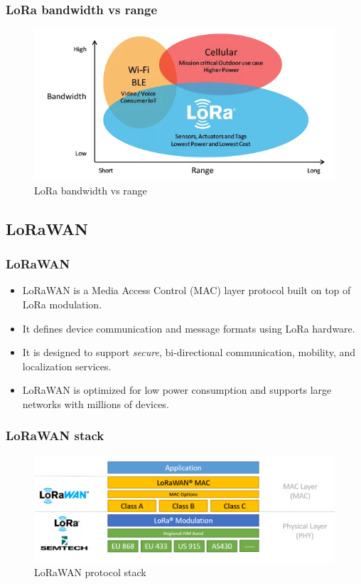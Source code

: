 \documentclass{beamer}
\begin{document}
\begin{frame}
    \frametitle{LoRa bandwidth vs range}
    \begin{figure}
        \centering
        \includegraphics[width=\textwidth]{images/bandwidth-vs-range.png}
        \caption{LoRa bandwidth vs range}
    \end{figure}
\end{frame}

\subsection{LoRaWAN}
\begin{frame}
    \frametitle{LoRaWAN}
    \begin{itemize}[<+->]
        \item LoRaWAN is a Media Access Control (MAC) layer protocol built on top of LoRa
              modulation.
        \item It defines device communication and message formats using LoRa hardware.
        \item It is designed to support \emph{secure}, bi-directional communication,
              mobility, and localization services.
        \item LoRaWAN is optimized for low power consumption and supports large networks with
              millions of devices.
    \end{itemize}
\end{frame}

\begin{frame}
    \frametitle{LoRaWAN stack}
    \begin{figure}
        \centering
        \includegraphics[width=\textwidth]{images/lorawan-stack.png}
        \caption{LoRaWAN protocol stack}
    \end{figure}
\end{frame}
\end{document}
